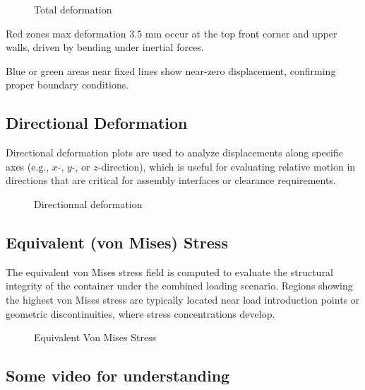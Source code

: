 \documentclass[11pt,a4paper]{article}
\begin{document}
	\begin{figure}[H]
		\centering
		\caption{Total deformation }
		\label{fig: Total deformation }
	\end{figure}
	
	Red zones max deformation  $ 3.5 $ mm  occur at the top front corner and upper walls, driven by bending under inertial forces.
	
	Blue or green areas near fixed lines show near-zero displacement, confirming proper boundary conditions.
	
	
	\subsection{Directional Deformation}
	
	Directional deformation plots are used to analyze displacements along specific axes (e.g., \(x\)-, \(y\)-, or \(z\)-direction), which is useful for evaluating relative motion in directions that are critical for assembly interfaces or clearance requirements. 
	
	\begin{figure}[H]
		\centering
		\caption{Directionnal deformation }
		\label{fig:directional deformation}
	\end{figure}
	
	\subsection{Equivalent (von Mises) Stress}
	
	The equivalent von Mises stress field is computed to evaluate the structural integrity of the container under the combined loading scenario.
	Regions showing the highest von Mises stress are typically located near load introduction points or geometric discontinuities, where stress concentrations develop. 
	
	\begin{figure}[H]
		\centering
		\caption{Equivalent Von Mises Stress}
		\label{fig: Stress}
	\end{figure}
	
	
	\subsection{Some video for understanding }
	
\end{document}
